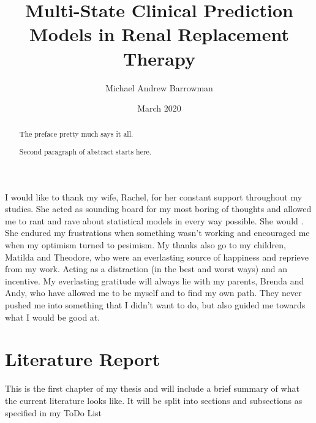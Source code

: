 \documentclass[12pt,twoside]{reedthesis}
\title{Multi-State Clinical Prediction Models in Renal Replacement Therapy}
\author{Michael Andrew Barrowman}
\date{March 2020}
\begin{document}
  \maketitle

\frontmatter %
\pagestyle{empty} %
  \begin{acknowledgements}
    I would like to thank my wife, Rachel, for her constant support throughout my studies. She acted as sounding board for my most boring of thoughts and allowed me to rant and rave about statistical models in every way possible. She would . She endured my frustrations when something wasn't working and encouraged me when my optimism turned to pesimism.
    My thanks also go to my children, Matilda and Theodore, who were an everlasting source of happiness and reprieve from my work. Acting as a distraction (in the best and worst ways) and an incentive.
    My everlasting gratitude will always lie with my parents, Brenda and Andy, who have allowed me to be myself and to find my own path. They never pushed me into something that I didn't want to do, but also guided me towards what I would be good at.
  \end{acknowledgements}

  \hypersetup{linkcolor=black}
  \setcounter{tocdepth}{2}
  \tableofcontents

  \listoftables

  \listoffigures
  \begin{abstract}
    The preface pretty much says it all.

    \par

    Second paragraph of abstract starts here.
  \end{abstract}

\mainmatter %
\pagestyle{fancyplain} %



\hypertarget{chap-lit-report}{%
\chapter{Literature Report}\label{chap-lit-report}}

This is the first chapter of my thesis and will include a brief summary of what the current literature looks like. It will be split into sections and subsections as specified in my ToDo List
\end{document}
